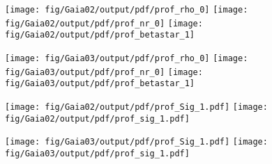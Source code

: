\begin{figure*}
    \begin{center}
        \texttt{[image: fig/Gaia02/output/pdf/prof\_rho\_0]}\hspace{-3mm}
        \texttt{[image: fig/Gaia02/output/pdf/prof\_nr\_0]}\hspace{-3mm}
        \texttt{[image: fig/Gaia02/output/pdf/prof\_betastar\_1]}

        \texttt{[image: fig/Gaia03/output/pdf/prof\_rho\_0]}\hspace{-3mm}
        \texttt{[image: fig/Gaia03/output/pdf/prof\_nr\_0]}\hspace{-3mm}
        \texttt{[image: fig/Gaia03/output/pdf/prof\_betastar\_1]}

        \caption{Reconstructed density for 1pop core (top), and 1pop
          cusp (bottom); logarithmic density slope; and velocity
          anisotropy profile, using all tracer stars, on the order of
          3000. The input model profile is marked by the blue dashed
          line; the red line and grey contours show the median, 68\%
          and 95\% confidence intervals for our chains, respectively;
          the vertical green line marks the 3D half-light radius of
          the stars; and the gray lines show a sub-set of individual
          models. The full ensemble shown samples of accepted models
          in total.}
        \label{fig:singlepop}
    \end{center}
\end{figure*}

\begin{figure*}
    \begin{center}
        \texttt{[image: fig/Gaia02/output/pdf/prof\_Sig\_1.pdf]}
        \texttt{[image: fig/Gaia02/output/pdf/prof\_sig\_1.pdf]}

        \texttt{[image: fig/Gaia03/output/pdf/prof\_Sig\_1.pdf]}
        \texttt{[image: fig/Gaia03/output/pdf/prof\_sig\_1.pdf]}
        \caption{\label{fig:Sigsiglos1pop} Tracer
          surface density profile $\Sigma(r)$, and
          projected velocity dispersion profile
          $\siglos(r)$ (right) for the stars in
          the single component cusped profile of
          Figure \ref{fig:singlepop}. The vertical
          green lines show the 3D projected
          half-light radius.}
    \end{center}
\end{figure*}

